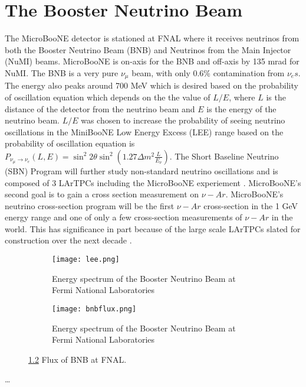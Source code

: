 \chapter{The Booster Neutrino Beam}
The MicroBooNE detector is stationed at FNAL where it receives neutrinos from both the Booster Neutrino Beam (BNB) and Neutrinos from the Main Injector (NuMI) beams. MicroBooNE is on-axis for the BNB and off-axis by 135 mrad for NuMI. The BNB is a very pure $\nu_{\mu}$ beam, with only 0.6\% contamination from $\nu_{e}s$. The energy also peaks around 700 MeV which is desired based on the probability of oscillation equation which depends on the the value of $L/E$, where $L$ is the distance of the detector from the neutrino beam and $E$ is the energy of the neutrino beam. $L/E$ was chosen to increase the probability of seeing neutrino oscillations in the MiniBooNE Low Energy Excess (LEE) range based on the probability of oscillation equation is $ P_{\nu_{\mu}\rightarrow \nu_{e}}\left(L,E\right) = \sin^2 2\theta \sin^2 \left(1.27\Delta m^2 \frac{L}{E_{\nu}}\right)$. The Short Baseline Neutrino (SBN) Program will further study non-standard neutrino oscillations and is composed of 3 LArTPCs including the MicroBooNE experiement \cite{SBN}. MicroBooNE's second goal is to gain a cross section measurement on $\nu-Ar$. MicroBooNE's neutrino cross-section program will be the first $\nu-Ar$ cross-section in the 1 GeV energy range and one of only a few cross-section measurements of $\nu-Ar$ in the world. This has significance in part because of the large scale LArTPCs slated for construction over the next decade \cite{dune} \cite{SBN}. 


\begin{figure}[htp!]
\centering
	\begin{subfigure}[b]{.4\textwidth}
	\texttt{[image: lee.png]}
	\label{fig:lee}
	\caption{Energy spectrum of the Booster Neutrino Beam at Fermi National Laboratories}
	\end{subfigure}
	\quad
	\begin{subfigure}[b]{.4\textwidth}
	\texttt{[image: bnbflux.png]}
	\label{fig:bnbflux}
	\caption{Energy spectrum of the Booster Neutrino Beam at Fermi National Laboratories}
	\end{subfigure}
	\quad
\label{fig:figures}
\caption{\ref{fig:bnbflux} Flux of BNB at FNAL.}
\end{figure}
\clearpage
\dots

